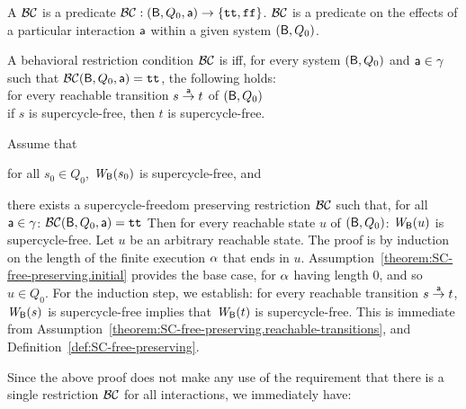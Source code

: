 

A  $\BC$ is a predicate
$\BC: (\B, Q_0, \act) \to \set{\ttt, \fff}$.
\ed
%
$\BC$ is a predicate on the effects of a particular interaction $\act$ within a given system
$(\B, Q_0)$.

 \label{def:SC-free-preserving}
A behavioral restriction condition $\BC$ is  iff, for every system 
$(\B, Q_0)$ and $\act \in \gamma$ such that $\BC(\B, Q_0, \act) = \ttt$, the following holds:\\[2ex]
%
\ind \ind for every reachable transition $s \goesto[\act] t$ of $(\B, Q_0)$\\
\ind \ind \ind if $s$ is supercycle-free, then $t$ is supercycle-free.
\ed


\label{theorem:SC-free-preserving.deadlock-free}
\label{thm:SC-free-preserving.deadlock-free}
Assume that
\bn
\item \label{theorem:SC-free-preserving.initial}
      for all $s_0 \in Q_0$, $\wfg{\B}{s_0}$ is supercycle-free, and
\item \label{theorem:SC-free-preserving.reachable-transitions}
   there exists a supercycle-freedom preserving restriction $\BC$ such that,
   for all $\act \in \gamma$: $\BC(\B, Q_0, \act) = \ttt$ 
\en
Then for every reachable state $u$ of $(\B, Q_0)$:  $\wfg{\B}{u}$ is supercycle-free.
\et
%
\bpr Let $u$ be an arbitrary reachable state. The proof is by induction on the length of the finite
execution $\al$ that ends in $u$.  Assumption~\ref{theorem:SC-free-preserving.initial} provides the
base case, for $\al$ having length 0, and so $u \in Q_0$.  For the induction step, we establish: for
every reachable transition $s \la{\act} t$, $\wfg{\B}{s}$ is supercycle-free implies that
$\wfg{\B}{t}$ is supercycle-free. This is immediate from
Assumption~\ref{theorem:SC-free-preserving.reachable-transitions}, and
Definition~\ref{def:SC-free-preserving}.  \epr

Since the above proof does not make any use of the requirement that there is a single restriction
$\BC$ for all interactions, we immediately have:


